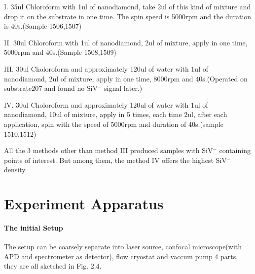 I. 35ul Chloroform with 1ul of nanodiamond, take 2ul of this kind of mixture and drop it on the substrate in one time. The spin speed is 5000rpm and the duration is 40s.(Sample 1506,1507)

II. 30ul Chloroform with 1ul of nanodiamond, 2ul of mixture, apply in one time, 5000rpm and 40s.(Sample 1508,1509)

III. 30ul Choloroform and approximately 120ul of water with 1ul of nanodiamond, 2ul of mixture, apply in one time, 8000rpm and 40s.(Operated on substrate207 and found no SiV$^{-}$ signal later.)

IV. 30ul Choloroform and approximately 120ul of water with 1ul of nanodiamond, 10ul of mixture, apply in 5 times, each time 2ul, after each application, spin with the speed of 5000rpm and  duration of 40s.(sample 1510,1512)

All the 3 methods other than method III produced samples with SiV$^{-}$ containing points of interest. But among them, the method IV offers the highest SiV$^{-}$ density.
 

\section[experiment apparatus]{Experiment Apparatus}

\paragraph{The initial Setup} 

The setup can be coarsely separate into laser source, confocal microscope(with APD and spectrometer as detector), flow cryostat and vaccum pump 4 parts, they are all sketched in Fig. 2.4.

